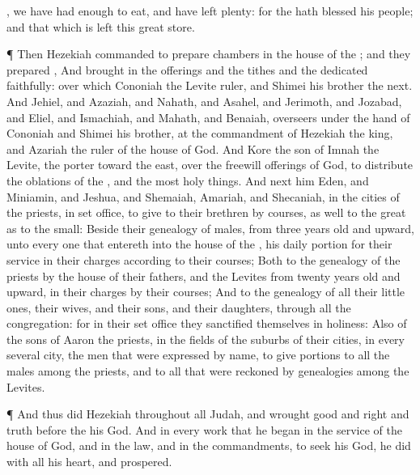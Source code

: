 {{}, we have had
enough to
eat, and have
left
plenty: for the
{} hath
blessed his
people; and that which is
left
{} this great
store.
\par }{\PP {}¶ Then
Hezekiah
commanded to
prepare
chambers in the
house of the
{}; and they
prepared
{},
And brought
in the
offerings and the
tithes and the
dedicated
{}
faithfully: over which
Cononiah the
Levite
{}
ruler, and
Shimei his
brother
{} the
next.
And
Jehiel, and
Azaziah, and
Nahath, and
Asahel, and
Jerimoth, and
Jozabad, and
Eliel, and
Ismachiah, and
Mahath, and
Benaiah,
{}
overseers under the
hand of
Cononiah and
Shimei his
brother, at the
commandment of
Hezekiah the
king, and
Azariah the
ruler of the
house of
God.
And
Kore the
son of
Imnah the
Levite, the
porter toward the
east,
{} over the freewill
offerings of
God, to
distribute the
oblations of the
{}, and the
most holy
things.
And next him
{}
Eden, and
Miniamin, and
Jeshua, and
Shemaiah,
Amariah, and
Shecaniah, in the
cities of the
priests, in
{} set
office, to
give to their
brethren
by
courses, as well to the
great as to the
small:
Beside their
genealogy of
males, from
three
years
old and
upward,
{} unto every one that
entereth into the
house of the
{}, his
daily
portion for their
service in their
charges according to their
courses;
Both to the
genealogy of the
priests by the
house of their
fathers, and the
Levites from
twenty
years
old and
upward, in their
charges by their
courses;
And to the
genealogy of all their little
ones, their
wives, and their
sons, and their
daughters, through all the
congregation: for in their set
office they
sanctified themselves in
holiness:
Also of the
sons of
Aaron the
priests,
{} in the
fields of the
suburbs of their
cities, in every several
city, the
men that were
expressed by
name, to
give
portions to all the
males among the
priests, and to all that were reckoned by
genealogies among the
Levites.
\par }{\PP {}¶ And thus
did
Hezekiah throughout all
Judah, and
wrought
{}
good and
right and
truth
before the
{} his
God.
And in every
work that he
began in the
service of the
house of
God, and in the
law, and in the
commandments, to
seek his
God, he
did
{} with all his
heart, and
prospered.

}
